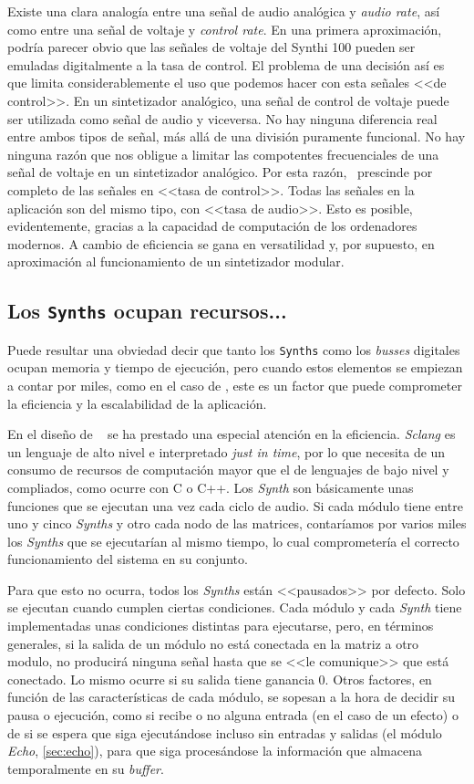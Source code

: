 Existe una clara analogía entre una señal de audio analógica y \textit{audio rate}, así como entre una señal de voltaje y \textit{control rate}. En una primera aproximación, podría parecer obvio que las señales de voltaje del Synthi 100 pueden ser emuladas digitalmente a la tasa de control. El problema de una decisión así es que limita considerablemente el uso que podemos hacer con esta señales <<de control>>. En un sintetizador analógico, una señal de control de voltaje puede ser utilizada como señal de audio y viceversa. No hay ninguna diferencia real entre ambos tipos de señal, más allá de una división puramente funcional. No hay ninguna razón que nos obligue a limitar las compotentes frecuenciales de una señal de voltaje en un sintetizador analógico. Por esta razón, \appName\ prescinde por completo de las señales en <<tasa de control>>. Todas las señales en la aplicación son del mismo tipo, con <<tasa de audio>>. Esto es posible, evidentemente, gracias a la capacidad de computación de los ordenadores modernos. A cambio de eficiencia se gana en versatilidad y, por supuesto, en aproximación al funcionamiento de un sintetizador modular.


\subsection{Los \texttt{Synths} ocupan recursos...}
Puede resultar una obviedad decir que tanto los \texttt{Synths} como los \textit{busses} digitales ocupan memoria y tiempo de ejecución, pero cuando estos elementos se empiezan a contar por miles, como en el caso de \appName, este es un factor que puede comprometer la eficiencia y la escalabilidad de la aplicación.

En el diseño de \appName~ se ha prestado una especial atención en la eficiencia. \textit{Sclang} es un lenguaje de alto nivel e interpretado \textit{just in time}, por lo que necesita de un consumo de recursos de computación mayor que el de lenguajes de bajo nivel y compliados, como ocurre con C o C++. Los \textit{Synth} son básicamente unas funciones que se ejecutan una vez cada ciclo de audio. Si cada módulo tiene entre uno y cinco \textit{Synths} y otro cada nodo de las matrices, contaríamos por varios miles los \textit{Synths} que se ejecutarían al mismo tiempo, lo cual comprometería el correcto funcionamiento del sistema en su conjunto.

Para que esto no ocurra, todos los \textit{Synths} están <<pausados>> por defecto. Solo se ejecutan cuando cumplen ciertas condiciones. Cada módulo y cada \textit{Synth} tiene implementadas unas condiciones distintas para ejecutarse, pero, en términos generales, si la salida de un módulo no está conectada en la matriz a otro modulo, no producirá ninguna señal hasta que se <<le comunique>> que está conectado. Lo mismo ocurre si su salida tiene ganancia $0$. Otros factores, en función de las características de cada módulo, se sopesan a la hora de decidir su pausa o ejecución, como si recibe o no alguna entrada (en el caso de un efecto) o de si se espera que siga ejecutándose incluso sin entradas y salidas (el módulo \textit{Echo}, \ref{sec:echo}), para que siga procesándose la información que almacena temporalmente en su \textit{buffer}. 


